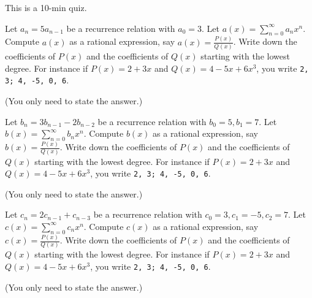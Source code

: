 

\renewcommand\AUTHOR{jdoe5@cougars.ccis.edu} %


\topmattertwo

This is a 10-min quiz.

\nextq
Let $a_n = 5a_{n-1}$ be a recurrence relation with $a_0 = 3$.
Let $a(x) = \sum_{n=0}^\infty a_n x^n$.
Compute $a(x)$ as a rational expression, say $a(x) = \frac{P(x)}{Q(x)}$.
Write down the coefficients of $P(x)$ and the coefficients of $Q(x)$
starting with the lowest degree.
For instance if $P(x) = 2 + 3x$ and $Q(x) = 4 - 5x + 6x^3$, you write
\verb!2, 3; 4, -5, 0, 6!.
\\
\ANSWER
\begin{answerlong}

\end{answerlong}
(You only need to state the answer.)

\nextq
Let $b_n = 3b_{n-1} - 2b_{n-2}$ be a recurrence relation
with $b_0 = 5, b_1 = 7$.
Let $b(x) = \sum_{n=0}^\infty b_n x^n$.
Compute $b(x)$ as a rational expression, say $b(x) = \frac{P(x)}{Q(x)}$.
Write down the coefficients of $P(x)$ and the coefficients of $Q(x)$
starting with the lowest degree.
For instance if $P(x) = 2 + 3x$ and $Q(x) = 4 - 5x + 6x^3$, you write
\verb!2, 3; 4, -5, 0, 6!.
\\
\ANSWER
\begin{answerlong}

\end{answerlong}
(You only need to state the answer.)

\nextq
Let $c_n = 2c_{n-1} + c_{n-3}$ be a recurrence relation
with $c_0 = 3, c_1 = -5, c_2 = 7$.
Let $c(x) = \sum_{n=0}^\infty c_n x^n$.
Compute $c(x)$ as a rational expression, say $c(x) = \frac{P(x)}{Q(x)}$.
Write down the coefficients of $P(x)$ and the coefficients of $Q(x)$
starting with the lowest degree.
For instance if $P(x) = 2 + 3x$ and $Q(x) = 4 - 5x + 6x^3$, you write
\verb!2, 3; 4, -5, 0, 6!.
\\
\ANSWER
\begin{answerlong}

\end{answerlong}
(You only need to state the answer.)

\newpage


